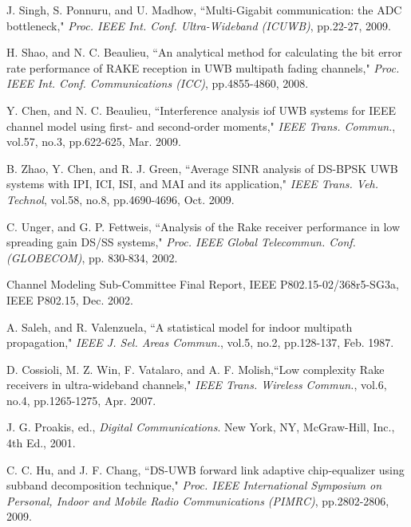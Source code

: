 \documentclass[journal]{IEEEtran}
\begin{document}
\begin{thebibliography}{10}
J. Singh, S. Ponnuru, and U. Madhow, ``Multi-Gigabit communication:
the ADC bottleneck," {\it Proc. IEEE Int. Conf. Ultra-Wideband
(ICUWB)}, pp.22-27, 2009.

H. Shao, and N. C. Beaulieu, ``An analytical method for calculating
the bit error rate performance of RAKE reception in UWB multipath
fading channels," {\it Proc. IEEE Int. Conf. Communications (ICC)},
pp.4855-4860, 2008.


Y. Chen, and N. C. Beaulieu, ``Interference analysis iof UWB systems
for IEEE channel model using first- and second-order moments," {\it
IEEE Trans. Commun.}, vol.57, no.3, pp.622-625, Mar. 2009.




B. Zhao, Y. Chen, and R. J. Green, ``Average SINR analysis of
DS-BPSK UWB systems with IPI, ICI, ISI, and MAI and its
application," {\it IEEE Trans. Veh. Technol}, vol.58, no.8,
pp.4690-4696, Oct. 2009.

C. Unger, and G. P. Fettweis, ``Analysis of the Rake receiver
performance in low spreading gain DS/SS systems," {\it Proc. IEEE
Global Telecommun. Conf. (GLOBECOM)}, pp. 830-834, 2002.

Channel Modeling Sub-Committee Final Report, IEEE
P802.15-02/368r5-SG3a, IEEE P802.15, Dec. 2002.

A. Saleh, and R. Valenzuela, ``A statistical model for indoor
multipath propagation," {\it IEEE J. Sel. Areas Commun.}, vol.5,
no.2, pp.128-137, Feb. 1987.

D. Cossioli, M. Z. Win, F. Vatalaro, and A. F. Molish,``Low
complexity Rake receivers in ultra-wideband channels," {\it IEEE
Trans. Wireless Commun.}, vol.6, no.4, pp.1265-1275, Apr. 2007.




J. G. Proakis, ed., {\it Digital Communications}. New York, NY,
McGraw-Hill, Inc., 4th Ed., 2001.

C. C. Hu, and J. F. Chang, ``DS-UWB forward link adaptive
chip-equalizer using subband decomposition technique," {\it Proc.
IEEE International Symposium on Personal, Indoor and Mobile Radio
Communications (PIMRC)}, pp.2802-2806, 2009.





\end{thebibliography}
\end{document}
